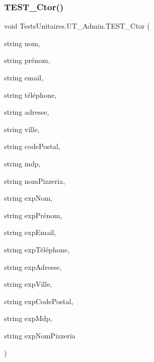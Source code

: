 \subsubsection{\texorpdfstring{T\+E\+S\+T\+\_\+\+Ctor()}{TEST\_Ctor()}}
{\footnotesize\ttfamily void Tests\+Unitaires.\+U\+T\+\_\+\+Admin.\+T\+E\+S\+T\+\_\+\+Ctor (\begin{DoxyParamCaption}\item[{string}]{nom,  }\item[{string}]{prénom,  }\item[{string}]{email,  }\item[{string}]{téléphone,  }\item[{string}]{adresse,  }\item[{string}]{ville,  }\item[{string}]{code\+Postal,  }\item[{string}]{mdp,  }\item[{string}]{nom\+Pizzeria,  }\item[{string}]{exp\+Nom,  }\item[{string}]{exp\+Prénom,  }\item[{string}]{exp\+Email,  }\item[{string}]{exp\+Téléphone,  }\item[{string}]{exp\+Adresse,  }\item[{string}]{exp\+Ville,  }\item[{string}]{exp\+Code\+Postal,  }\item[{string}]{exp\+Mdp,  }\item[{string}]{exp\+Nom\+Pizzeria }\end{DoxyParamCaption})\hspace{0.3cm}{\ttfamily [inline]}}


